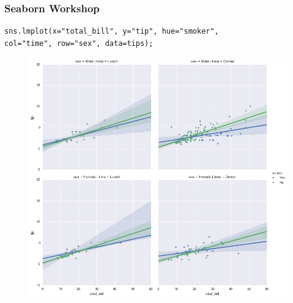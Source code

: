 \documentclass{beamer}
\begin{document}
\begin{frame}[fragile]
	\frametitle{Seaborn Workshop}
	\large
\begin{verbatim}
sns.lmplot(x="total_bill", y="tip", hue="smoker",
col="time", row="sex", data=tips);
\end{verbatim}

\begin{figure}
	\centering
	\includegraphics[width=0.7\linewidth]{images/regression_44_0}
\end{figure}
\end{frame}
\end{document}
